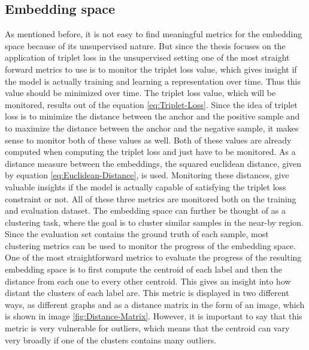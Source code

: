 \subsection{Embedding space}
\label{sub:Metrics-Embedding-Space}
As mentioned before, it is not easy to find meaningful metrics for the embedding space because of its unsupervised nature. But since the thesis focuses on the application of triplet loss in the unsupervised setting one of the most straight forward metrics to use is to monitor the triplet loss value, which gives insight if the model is actually training and learning a representation over time. Thus this value should be minimized over time. The triplet loss value, which will be monitored, results out of the equation \ref{eq:Triplet-Loss}. Since the idea of triplet loss is to minimize the distance between the anchor and the positive sample and to maximize the distance between the anchor and the negative sample, it makes sense to monitor both of these values as well. Both of these values are already computed when computing the triplet loss and just have to be monitored. As a distance measure between the embeddings, the squared euclidean distance, given by equation \ref{eq:Euclidean-Distance}, is used. Monitoring these distances, give valuable insights if the model is actually capable of satisfying the triplet loss constraint or not. All of these three metrics are monitored both on the training and evaluation dataset.
\newline
\newline
The embedding space can further be thought of as a clustering task, where the goal is to cluster similar samples in the near-by region. Since the evaluation set contains the ground truth of each sample, most clustering metrics can be used to monitor the progress of the embedding space. 
\newline
\newline
One of the most straightforward metrics to evaluate the progress of the resulting embedding space is to first compute the centroid of each label and then the distance from each one to every other centroid. This gives an insight into how distant the clusters of each label are. This metric is displayed in two different ways, as different graphs and as a distance matrix in the form of an image, which is shown in image \ref{fig:Distance-Matrix}. However, it is important to say that this metric is very vulnerable for outliers, which means that the centroid can vary very broadly if one of the clusters contains many outliers.
\newline
